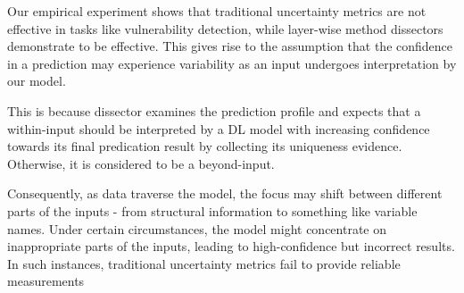 
Our empirical experiment shows that traditional uncertainty metrics are not effective in tasks like vulnerability detection, while layer-wise method dissectors demonstrate to be effective. This gives rise to the assumption that the confidence in a prediction may experience variability as an input undergoes interpretation by our model.

This is because dissector examines the prediction profile and expects that a within-input should be interpreted by a DL model with increasing confidence towards its final predication result by collecting its uniqueness evidence. Otherwise, it is considered to be a beyond-input.

Consequently, as data traverse the model, the focus may shift between different parts of the inputs - from structural information to something like variable names. Under certain circumstances, the model might concentrate on inappropriate parts of the inputs, leading to high-confidence but incorrect results. In such instances, traditional uncertainty metrics fail to provide reliable measurements